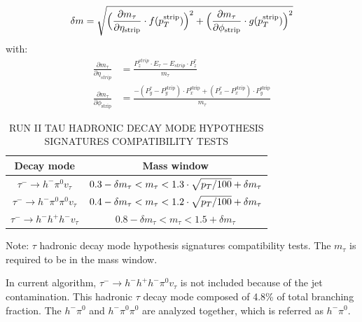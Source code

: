 \begin{align*}
\delta m&=\sqrt{\Big(\frac{\partial m_{\tau}}{\partial \eta_\text{{strip}}}\cdot f(p_{T}^\text{{strip}})\Big)^{2}+\Big(\frac{\partial m_{\tau}}{\partial \phi_\text{{strip}}}\cdot g(p_{T}^\text{{strip}})\Big)^{2}}\\
\end{align*}
with:
\begin{align*}
\frac{\partial m_{\tau}}{\partial\eta_{strip}}&=\frac{P_{z}^{strip}\cdot E_{\tau}-E_{strip}\cdot P_{z}^{\tau}}{m_{\tau}}\\
\frac{\partial m_{\tau}}{\partial\phi_\text{{strip}}}&=\frac{-(P_{y}^{\tau}-P_{y}^\text{{strip}})\cdot P_{x}^\text{{strip}}+(P_{x}^{\tau}-P_{x}^\text{{strip}})\cdot P_{y}^\text{{strip}}}{m_{\tau}}
\end{align*}


\begin{table}[htp]
\begin{threeparttable}
\caption{RUN II TAU HADRONIC DECAY MODE HYPOTHESIS SIGNATURES COMPATIBILITY TESTS}
\label{tb:tauHdecayRecomass}
\begin{center}
\begin{tabular}{|c|c|}
\hline
Decay mode                                             & Mass window\\\hline
$\tau^{-}\to h^{-}\pi^{0} v_{\tau}$                       & $0.3-\delta m_{\tau}<m_{\tau}<1.3\cdot \sqrt{p_{T}/100}+\delta m_{\tau}$      \\\hline
$\tau^{-}\to h^{-}\pi^{0} \pi^{0}  v_{\tau}$       &  $0.4-\delta m_{\tau}<m_{\tau}<1.2\cdot \sqrt{p_{T}/100}+\delta m_{\tau}$   \\\hline
$\tau^{-}\to h^{-}h^{+}h^{-}v_{\tau}$                     & $0.8-\delta m_{\tau}<m_{\tau}<1.5+\delta m_{\tau}$   \\\hline
 \end{tabular}
 \begin{tablenotes}
 \small
 \item{Note:} $\tau$ hadronic decay mode hypothesis signatures compatibility tests. The $m_{\tau}$ is required to be in the mass window.
 \end{tablenotes}
\end{center}
\end{threeparttable}
\end{table}

In current algorithm, $\tau^{-}\to h^{-}h^{+}h^{-}\pi^{0}v_{\tau}$ is not included because of the jet contamination. This hadronic $\tau$ decay mode composed of 4.8\% of total branching fraction. The $h^{-}\pi^{0}$ and $h^{-}\pi^{0}\pi^{0}$ are analyzed together, which is referred as $h^{-}\pi^{0}$.

